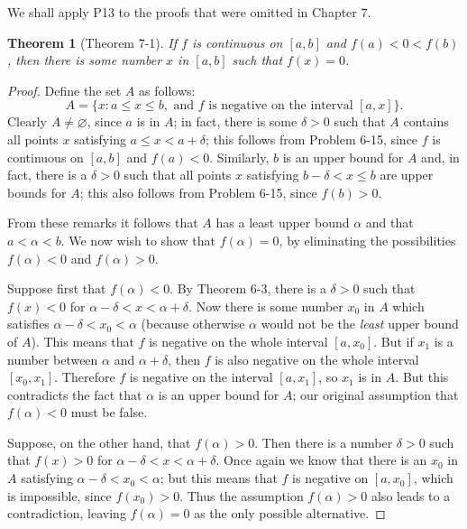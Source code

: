 \documentclass{article}
\newtheorem*{theorem*}{Theorem}
\begin{document}
We shall apply P13 to the proofs that were omitted in Chapter 7.

\begin{theorem*}[Theorem 7-1]
  If $f$ is continuous on $[a, b]$ and $f(a) < 0 < f(b)$, then there is some
  number $x$ in $[a, b]$ such that $f(x) = 0$.
\end{theorem*}
\begin{proof}
  Define the set $A$ as follows: \[
    A = \{x : a \leq x \leq b, \text{ and } f \text{ is negative on the interval
      } [a, x]\}.
  \] Clearly $A \neq \varnothing$, since $a$ is in $A$; in fact, there is some
  $\delta > 0$ such that $A$ contains all points $x$ satisfying $a \leq x < a +
  \delta$; this follows from Problem 6-15, since $f$ is continuous on $[a, b]$
  and $f(a) < 0$. Similarly, $b$ is an upper bound for $A$ and, in fact, there
  is a $\delta > 0$ such that all points $x$ satisfying $b - \delta < x \leq b$
  are upper bounds for $A$; this also follows from Problem 6-15, since $f(b) >
  0$.

  From these remarks it follows that $A$ has a least upper bound $\alpha$ and
  that $a < \alpha < b$. We now wish to show that $f(\alpha) = 0$, by
  eliminating the possibilities $f(\alpha) < 0$ and $f(\alpha) > 0$.

  Suppose first that $f(\alpha) < 0$. By Theorem 6-3, there is a $\delta > 0$
  such that $f(x) < 0$ for $\alpha - \delta < x < \alpha + \delta$. Now there is
  some number $x_0$ in $A$ which satisfies $\alpha - \delta < x_0 < \alpha$
  (because otherwise $\alpha$ would not be the \emph{least} upper bound of $A$).
  This means that $f$ is negative on the whole interval $[a, x_0]$. But if $x_1$
  is a number between $\alpha$ and $\alpha + \delta$, then $f$ is also negative
  on the whole interval $[x_0, x_1]$. Therefore $f$ is negative on the interval
  $[a, x_1]$, so $x_1$ is in $A$. But this contradicts the fact that $\alpha$ is
  an upper bound for $A$; our original assumption that $f(\alpha) < 0$ must be
  false.

  Suppose, on the other hand, that $f(\alpha) > 0$. Then there is a number
  $\delta > 0$ such that $f(x) > 0$ for $\alpha - \delta < x < \alpha + \delta$.
  Once again we know that there is an $x_0$ in $A$ satisfying $\alpha - \delta <
  x_0 < \alpha$; but this means that $f$ is negative on $[a, x_0]$, which is
  impossible, since $f(x_0) > 0$. Thus the assumption $f(\alpha) > 0$ also leads
  to a contradiction, leaving $f(\alpha) = 0$ as the only possible alternative.
\end{proof}
\end{document}
